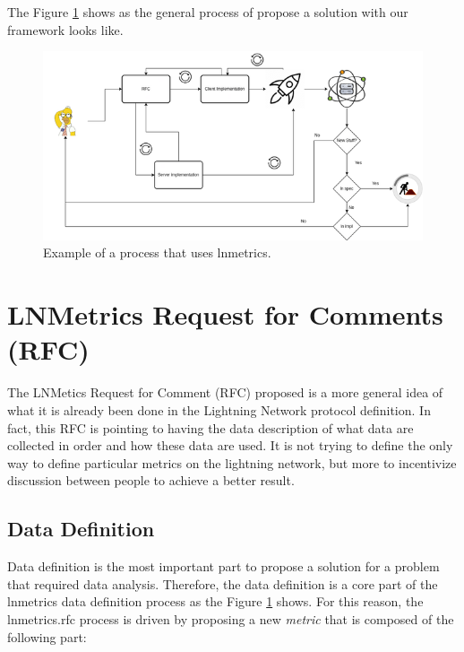 The Figure \ref{fig:lnmetrics_process} shows as the general process of propose 
a solution with our framework looks like.

\begin{figure}
    \begin{center}
      \includegraphics[scale=0.7]{imgs/lnmetrics-workflow-drawio.png}
    \end{center}
    \caption{Example of a process that uses lnmetrics.}
    \label{fig:lnmetrics_process}
\end{figure}


\section{LNMetrics Request for Comments (RFC)}

The LNMetics Request for Comment (RFC) proposed is a more general idea of what 
it is already been done in the Lightning Network protocol definition. In fact,
this RFC is pointing to having the data description of what data are collected in 
order and how these data are used. It is not trying to define the only way to 
define particular metrics on the lightning network, but more to incentivize
discussion between people to achieve a better result.

\subsection{Data Definition}

Data definition is the most important part to propose a solution for a problem 
that required data analysis. Therefore, the data definition is a core 
part of the lnmetrics data definition process as the Figure \ref{fig:lnmetrics_process}
shows. For this reason, the lnmetrics.rfc process is driven by proposing a new 
\emph{metric} that is composed of the following part:

